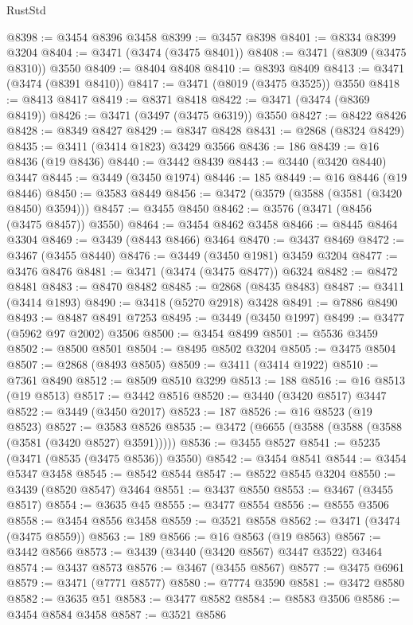 \begin{lexlean}{RustStd}
\begin{coremodule}
{{{{{{{{{{{{{{{{{{{@8398 := @3454 @8396 @3458
@8399 := @3457 @8398
@8401 := @8334 @8399 @3204
@8404 := @3471 (@3474 (@3475 @8401))
@8408 := @3471 (@8309 (@3475 @8310)) @3550
@8409 := @8404 @8408
@8410 := @8393 @8409
@8413 := @3471 (@3474 (@8391 @8410))
@8417 := @3471 (@8019 (@3475 @3525)) @3550
@8418 := @8413 @8417
@8419 := @8371 @8418
@8422 := @3471 (@3474 (@8369 @8419))
@8426 := @3471 (@3497 (@3475 @6319)) @3550
@8427 := @8422 @8426
@8428 := @8349 @8427
@8429 := @8347 @8428
@8431 := @2868 (@8324 @8429)
@8435 := @3411 (@3414 @1823) @3429 @3566
@8436 := 186
@8439 := @16 @8436 (@19 @8436)
@8440 := @3442 @8439
@8443 := @3440 (@3420 @8440) @3447
@8445 := @3449 (@3450 @1974)
@8446 := 185
@8449 := @16 @8446 (@19 @8446)
@8450 := @3583 @8449
@8456 := @3472 (@3579 (@3588 (@3581 (@3420 @8450) @3594)))
@8457 := @3455 @8450
@8462 := @3576 (@3471 (@8456 (@3475 @8457)) @3550)
@8464 := @3454 @8462 @3458
@8466 := @8445 @8464 @3304
@8469 := @3439 (@8443 @8466) @3464
@8470 := @3437 @8469
@8472 := @3467 (@3455 @8440)
@8476 := @3449 (@3450 @1981) @3459 @3204
@8477 := @3476 @8476
@8481 := @3471 (@3474 (@3475 @8477)) @6324
@8482 := @8472 @8481
@8483 := @8470 @8482
@8485 := @2868 (@8435 @8483)
@8487 := @3411 (@3414 @1893)
@8490 := @3418 (@5270 @2918) @3428
@8491 := @7886 @8490
@8493 := @8487 @8491 @7253
@8495 := @3449 (@3450 @1997)
@8499 := @3477 (@5962 @97 @2002) @3506
@8500 := @3454 @8499
@8501 := @5536 @3459
@8502 := @8500 @8501
@8504 := @8495 @8502 @3204
@8505 := @3475 @8504
@8507 := @2868 (@8493 @8505)
@8509 := @3411 (@3414 @1922)
@8510 := @7361 @8490
@8512 := @8509 @8510 @3299
@8513 := 188
@8516 := @16 @8513 (@19 @8513)
@8517 := @3442 @8516
@8520 := @3440 (@3420 @8517) @3447
@8522 := @3449 (@3450 @2017)
@8523 := 187
@8526 := @16 @8523 (@19 @8523)
@8527 := @3583 @8526
@8535 := @3472 (@6655 (@3588 (@3588 (@3588 (@3581 (@3420 @8527) @3591)))))
@8536 := @3455 @8527
@8541 := @5235 (@3471 (@8535 (@3475 @8536)) @3550)
@8542 := @3454 @8541
@8544 := @3454 @5347 @3458
@8545 := @8542 @8544
@8547 := @8522 @8545 @3204
@8550 := @3439 (@8520 @8547) @3464
@8551 := @3437 @8550
@8553 := @3467 (@3455 @8517)
@8554 := @3635 @45
@8555 := @3477 @8554
@8556 := @8555 @3506
@8558 := @3454 @8556 @3458
@8559 := @3521 @8558
@8562 := @3471 (@3474 (@3475 @8559))
@8563 := 189
@8566 := @16 @8563 (@19 @8563)
@8567 := @3442 @8566
@8573 := @3439 (@3440 (@3420 @8567) @3447 @3522) @3464
@8574 := @3437 @8573
@8576 := @3467 (@3455 @8567)
@8577 := @3475 @6961
@8579 := @3471 (@7771 @8577)
@8580 := @7774 @3590
@8581 := @3472 @8580
@8582 := @3635 @51
@8583 := @3477 @8582
@8584 := @8583 @3506
@8586 := @3454 @8584 @3458
@8587 := @3521 @8586
}}}}}}}}}}}}}}}}}}}
\end{coremodule}
\end{lexlean}

